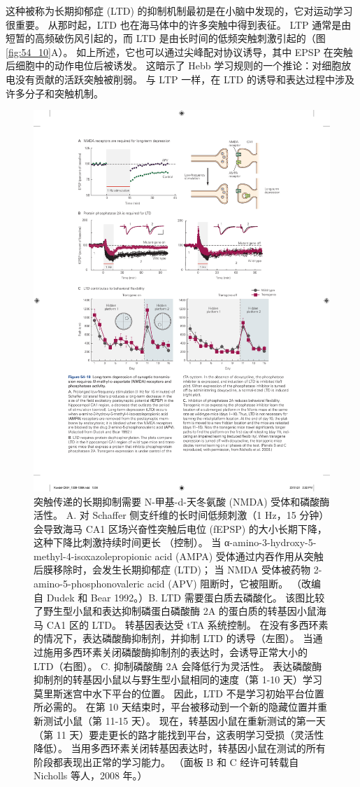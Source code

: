 这种被称为长期抑郁症 (LTD) 的抑制机制最初是在小脑中发现的，它对运动学习很重要。 从那时起，LTD 也在海马体中的许多突触中得到表征。 LTP 通常是由短暂的高频破伤风引起的，而 LTD 是由长时间的低频突触刺激引起的（图 \ref{fig:54_10}A）。 如上所述，它也可以通过尖峰配对协议诱导，其中 EPSP 在突触后细胞中的动作电位后被诱发。 这暗示了 Hebb 学习规则的一个推论：对细胞放电没有贡献的活跃突触被削弱。 与 LTP 一样，在 LTD 的诱导和表达过程中涉及许多分子和突触机制。

\begin{figure}[htbp]
	\centering
	\includegraphics[width=0.95\linewidth]{chap54/fig_54_10}
	\caption{突触传递的长期抑制需要 N-甲基-d-天冬氨酸 (NMDA) 受体和磷酸酶活性。 A. 对 Schaffer 侧支纤维的长时间低频刺激（1 Hz，15 分钟）会导致海马 CA1 区场兴奋性突触后电位 (fEPSP) 的大小长期下降，这种下降比刺激持续时间更长 （控制）。 当 α-amino-3-hydroxy-5-methyl-4-isoxazolepropionic acid (AMPA) 受体通过内吞作用从突触后膜移除时，会发生长期抑郁症 (LTD)； 当 NMDA 受体被药物 2-amino-5-phosphonovaleric acid (APV) 阻断时，它被阻断。 （改编自 Dudek 和 Bear 1992。）B. LTD 需要蛋白质去磷酸化。 该图比较了野生型小鼠和表达抑制磷蛋白磷酸酶 2A 的蛋白质的转基因小鼠海马 CA1 区的 LTD。 转基因表达受 tTA 系统控制。 在没有多西环素的情况下，表达磷酸酶抑制剂，并抑制 LTD 的诱导（左图）。 当通过施用多西环素关闭磷酸酶抑制剂的表达时，会诱导正常大小的 LTD（右图）。 C. 抑制磷酸酶 2A 会降低行为灵活性。 表达磷酸酶抑制剂的转基因小鼠以与野生型小鼠相同的速度（第 1-10 天）学习莫里斯迷宫中水下平台的位置。 因此，LTD 不是学习初始平台位置所必需的。 在第 10 天结束时，平台被移动到一个新的隐藏位置并重新测试小鼠（第 11-15 天）。 现在，转基因小鼠在重新测试的第一天（第 11 天）要走更长的路才能找到平台，这表明学习受损（灵活性降低）。 当用多西环素关闭转基因表达时，转基因小鼠在测试的所有阶段都表现出正常的学习能力。 （面板 B 和 C 经许可转载自 Nicholls 等人，2008 年。）}

\end{figure}

